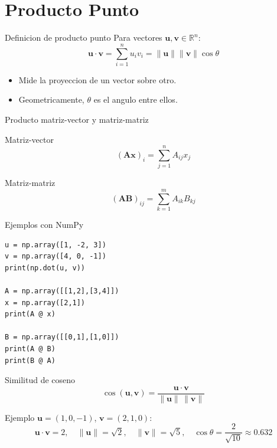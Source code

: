 \documentclass[aspectratio=169, 10pt, xcolor=table]{beamer}
\begin{document}
\section{Producto Punto}

\begin{frame}{Definicion de producto punto}
    Para vectores $\mathbf{u}, \mathbf{v} \in \mathbb{R}^n$:
    \[ \mathbf{u}\cdot\mathbf{v} = \sum_{i=1}^n u_i v_i = \|\mathbf{u}\| \|\mathbf{v}\| \cos\theta \]
    \begin{itemize}
        \item Mide la proyeccion de un vector sobre otro.
        \item Geometricamente, $\theta$ es el angulo entre ellos.
    \end{itemize}
\end{frame}

\begin{frame}{Producto matriz-vector y matriz-matriz}
    \begin{block}{Matriz-vector}
        \[ (\mathbf{A}\mathbf{x})_i = \sum_{j=1}^{n} A_{ij} x_j \]
    \end{block}
    \begin{block}{Matriz-matriz}
        \[ (\mathbf{A}\mathbf{B})_{ij} = \sum_{k=1}^{m} A_{ik} B_{kj} \]
    \end{block}
\end{frame}

\begin{frame}[fragile]{Ejemplos con NumPy}
\begin{lstlisting}
u = np.array([1, -2, 3])
v = np.array([4, 0, -1])
print(np.dot(u, v))

A = np.array([[1,2],[3,4]])
x = np.array([2,1])
print(A @ x)

B = np.array([[0,1],[1,0]])
print(A @ B)
print(B @ A)
\end{lstlisting}
\end{frame}

\begin{frame}{Similitud de coseno}
    \[ \cos(\mathbf{u},\mathbf{v}) = \frac{\mathbf{u}\cdot\mathbf{v}}{\|\mathbf{u}\|\,\|\mathbf{v}\|} \]
    \begin{exampleblock}{Ejemplo}
        $\mathbf{u}=(1,0,-1)$, $\mathbf{v}=(2,1,0)$:
        \[ \mathbf{u}\cdot\mathbf{v}=2,\quad \|\mathbf{u}\|=\sqrt{2},\quad \|\mathbf{v}\|=\sqrt{5},\quad \cos\theta=\frac{2}{\sqrt{10}}\approx0.632 \]
    \end{exampleblock}
\end{frame}
\end{document}

